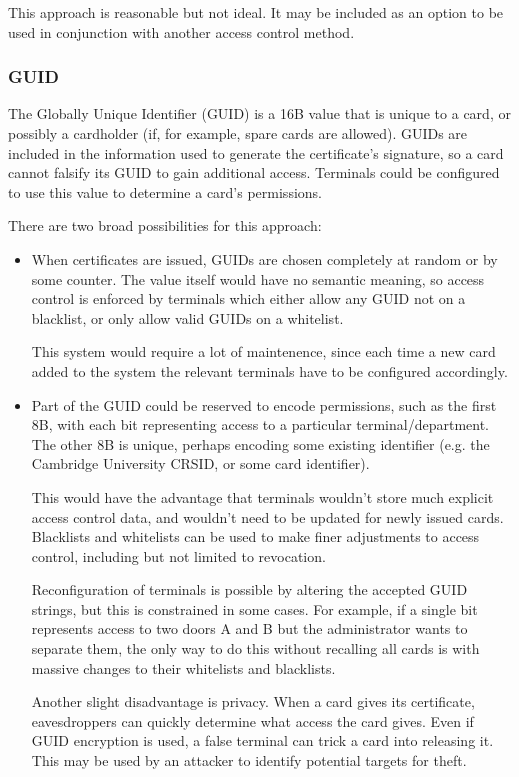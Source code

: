 \documentclass[12pt,a4paper]{article}
\begin{document}
This approach is reasonable but not ideal. It may be included as an option to be used in conjunction with another access control method.

\subsubsection{GUID}
The Globally Unique Identifier (GUID) is a 16B value that is unique to a card, or possibly a cardholder (if, for example, spare cards are allowed). GUIDs are included in the information used to generate the certificate's signature, so a card cannot falsify its GUID to gain additional access. Terminals could be configured to use this value to determine a card's permissions.

There are two broad possibilities for this approach:
\begin{itemize}
	\item When certificates are issued, GUIDs are chosen completely at random or by some counter. The value itself would have no semantic meaning, so access control is enforced by terminals which either allow any GUID not on a blacklist, or only allow valid GUIDs on a whitelist.
	
	This system would require a lot of maintenence, since each time a new card added to the system the relevant terminals have to be configured accordingly.
	
	\item Part of the GUID could be reserved to encode permissions, such as the first 8B, with each bit representing access to a particular terminal/department. The other 8B is unique, perhaps encoding some existing identifier (e.g. the Cambridge University CRSID, or some card identifier).
	
	This would have the advantage that terminals wouldn't store much explicit access control data, and wouldn't need to be updated for newly issued cards. Blacklists and whitelists can be used to make finer adjustments to access control, including but not limited to revocation.
	
	Reconfiguration of terminals is possible by altering the accepted GUID strings, but this is constrained in some cases. For example, if a single bit represents access to two doors A and B but the administrator wants to separate them, the only way to do this without recalling all cards is with massive changes to their whitelists and blacklists.
	
	Another slight disadvantage is privacy. When a card gives its certificate, eavesdroppers can quickly determine what access the card gives. Even if GUID encryption is used, a false terminal can trick a card into releasing it. This may be used by an attacker to identify potential targets for theft.
\end{itemize}
\end{document}
